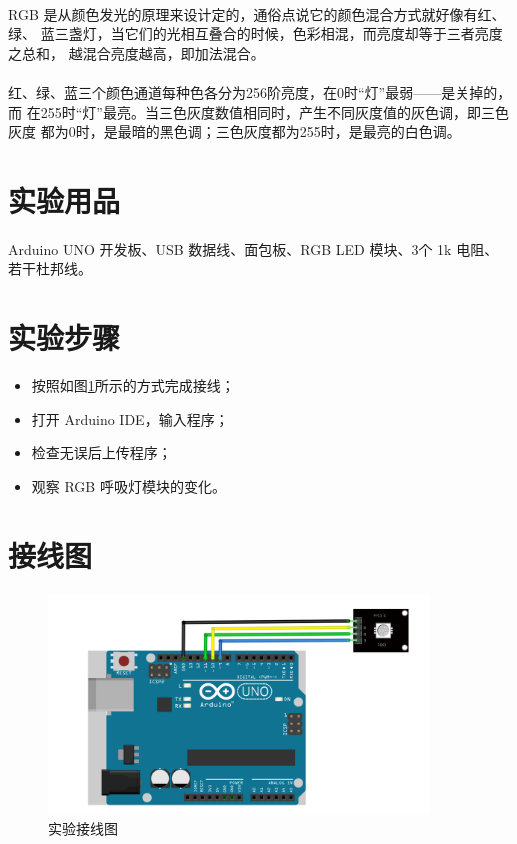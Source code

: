 \documentclass[UTF8, oneside]{ctexbook}
\begin{document}
\paragraph{}
RGB 是从颜色发光的原理来设计定的，通俗点说它的颜色混合方式就好像有红、绿、
蓝三盏灯，当它们的光相互叠合的时候，色彩相混，而亮度却等于三者亮度之总和，
越混合亮度越高，即加法混合。

\paragraph{}
红、绿、蓝三个颜色通道每种色各分为256阶亮度，在0时“灯”最弱——是关掉的，而
在255时“灯”最亮。当三色灰度数值相同时，产生不同灰度值的灰色调，即三色灰度
都为0时，是最暗的黑色调；三色灰度都为255时，是最亮的白色调。

\section{实验用品}
\paragraph{}
Arduino UNO 开发板、USB 数据线、面包板、RGB LED 模块、3个 1k 电阻、若干杜邦线。

\section{实验步骤}
\begin{itemize}
    \item[(1)] 按照如图\ref{b3_line}所示的方式完成接线；
    \item[(2)] 打开 Arduino IDE，输入程序；
    \item[(3)] 检查无误后上传程序；
    \item[(4)] 观察 RGB 呼吸灯模块的变化。
\end{itemize}

\section{接线图}
\begin{figure}[h]
    \centering
    \includegraphics[width=0.9\textwidth]{./result/basic/3/lines.png}
    \caption{实验接线图}
    \label{b3_line}
\end{figure}
\end{document}
